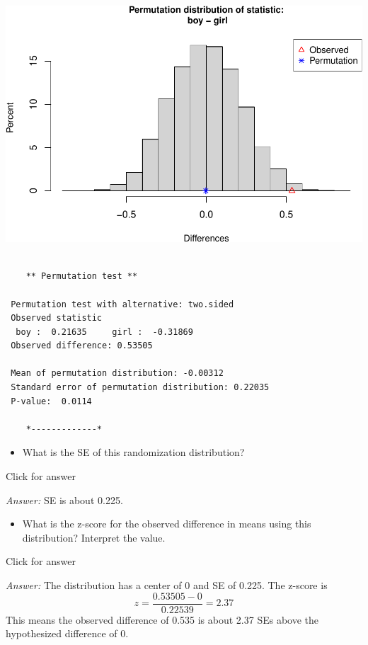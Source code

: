 \documentclass[
]{book}
\providecommand{\tightlist}{%
  \setlength{\itemsep}{0pt}\setlength{\parskip}{0pt}}
\begin{document}
\includegraphics[width=1\linewidth]{Class_Activity_14_files/figure-latex/unnamed-chunk-6-2}

\begin{verbatim}

    ** Permutation test **

 Permutation test with alternative: two.sided 
 Observed statistic
  boy :  0.21635     girl :  -0.31869 
 Observed difference: 0.53505 

 Mean of permutation distribution: -0.00312 
 Standard error of permutation distribution: 0.22035 
 P-value:  0.0114 

    *-------------*
\end{verbatim}

\begin{itemize}
\tightlist
\item
  What is the SE of this randomization distribution?
\end{itemize}

Click for answer

\emph{Answer:} SE is about 0.225.

\begin{itemize}
\tightlist
\item
  What is the z-score for the observed difference in means using this distribution? Interpret the value.
\end{itemize}

Click for answer

\emph{Answer:} The distribution has a center of 0 and SE of 0.225. The z-score is
\[
z = \dfrac{0.53505 - 0}{0.22539 } = 2.37
\]
This means the observed difference of 0.535 is about 2.37 SEs above the hypothesized difference of 0.
\end{document}
